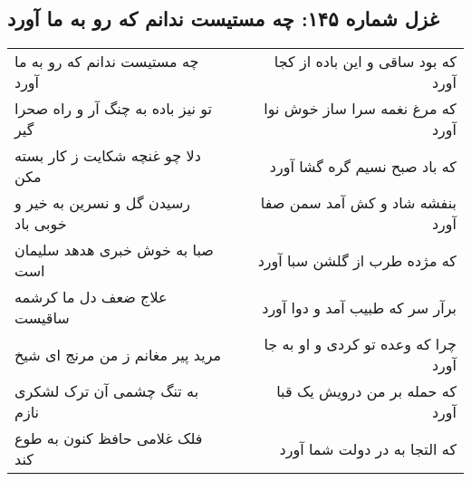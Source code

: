 \begin{center}
\section*{غزل شماره ۱۴۵: چه مستیست ندانم که رو به ما آورد}
\label{sec:sh145}
\begin{longtable}{l p{0.5cm} r}
چه مستیست ندانم که رو به ما آورد
&&
که بود ساقی و این باده از کجا آورد
\\
تو نیز باده به چنگ آر و راه صحرا گیر
&&
که مرغ نغمه سرا ساز خوش نوا آورد
\\
دلا چو غنچه شکایت ز کار بسته مکن
&&
که باد صبح نسیم گره گشا آورد
\\
رسیدن گل و نسرین به خیر و خوبی باد
&&
بنفشه شاد و کش آمد سمن صفا آورد
\\
صبا به خوش خبری هدهد سلیمان است
&&
که مژده طرب از گلشن سبا آورد
\\
علاج ضعف دل ما کرشمه ساقیست
&&
برآر سر که طبیب آمد و دوا آورد
\\
مرید پیر مغانم ز من مرنج ای شیخ
&&
چرا که وعده تو کردی و او به جا آورد
\\
به تنگ چشمی آن ترک لشکری نازم
&&
که حمله بر من درویش یک قبا آورد
\\
فلک غلامی حافظ کنون به طوع کند
&&
که التجا به در دولت شما آورد
\\
\end{longtable}
\end{center}
